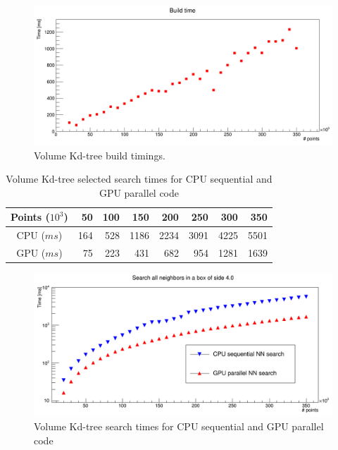 \begin{figure}
\includegraphics[width=\textwidth]{volumeKdPlot/volumeBuildTime.png}
\caption{Volume Kd-tree build timings.}
\label{volume_kdtree_plot}
\end{figure}

\begin{center}
\begin{table}[h]
\begin{tabular}{ c || r r r r r r r }
Points ($10^{3}$) & 50 & 100 & 150 & 200 & 250 & 300 & 350 \\
\hline
CPU ($\unit{ms}$) & 164 & 528 & 1186 & 2234 & 3091 & 4225 & 5501 \\
GPU ($\unit{ms}$) & 75 & 223 & 431 & 682 & 954 & 1281 & 1639 \\
\end{tabular}
\caption{Volume Kd-tree selected search times for CPU sequential and GPU parallel code}
\label{volume_kd_tree_tab}
\end{table}
\end{center}

\begin{figure}
\includegraphics[width=\textwidth]{volumeKdPlot/volumeKdTree.png}
\caption{Volume Kd-tree search times for CPU sequential and GPU parallel code}
\label{volume_kdtree_plot}
\end{figure}

